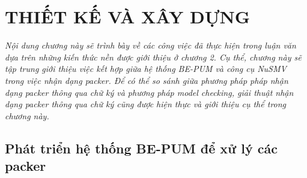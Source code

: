 
\newpage
\chapter{THIẾT KẾ VÀ XÂY DỰNG}

\begin{concept}[15cm]
\textit{Nội dung chương này sẽ trình bày về các công việc đã thực hiện trong luận văn dựa trên những kiến thức nền được giới thiệu ở chương 2. Cụ thể, chương này sẽ tập trung giới thiệu việc kết hợp giữa hệ thống BE-PUM và công cụ NuSMV trong việc nhận dạng packer. Để có thể so sánh giữa phương pháp pháp nhận dạng packer thông qua chữ ký và phương pháp model checking, giải thuật nhận dạng packer thông qua chữ ký cũng được hiện thực và giới thiệu cụ thể trong chương này.}
\end{concept}

\section{Phát triển hệ thống BE-PUM để xử lý các packer}

